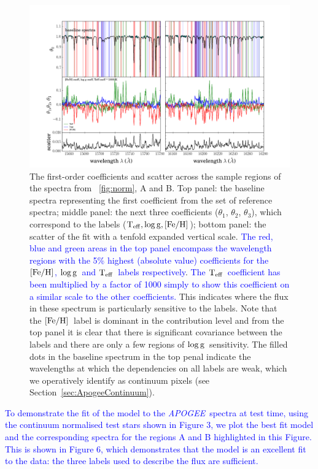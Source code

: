 \documentclass[12pt, preprint]{aastex}
\newcommand{\sectionname}{Section}
\newcommand{\apogee}{\textsl{APOGEE}}
\newcommand{\teff}{\mbox{$\rm T_{eff}$}}
\newcommand{\feh}{\mbox{$\rm [Fe/H]$}}
\newcommand{\logg}{\mbox{$\rm \log g$}}
\begin{document}
\begin{figure}[h!]
\centering
    \includegraphics[width=\hsize]{./plots/aftersubmit/fig5.png}
  \caption{The first-order coefficients and scatter across the sample regions of the spectra from \figurename~\ref{fig:norm}, A and B. Top panel: the baseline spectra representing the first coefficient from the set of reference spectra; middle panel: the next three coefficients ($\theta_1$, $\theta_2$, $\theta_3$),  which correspond to the labels ($\teff, \logg, \feh$); bottom panel: the scatter of the fit with a tenfold expanded vertical scale.  \textcolor{blue}{The red, blue and green areas in the top panel encompass the wavelength regions with the 5\% highest (absolute value) coefficients for the \feh, \logg\ and \teff\ labels respectively}. \textcolor{blue}{The \teff\ coefficient has been multiplied by a factor of 1000 simply to show this coefficient on a similar scale to the other coefficients.} This indicates where the flux in these spectrum is particularly sensitive to the labels.  Note that the \feh\ label is dominant in the contribution level and from the top panel it is clear that there is significant covariance between the labels and there are only a few regions of \logg\ sensitivity. The filled dots in the baseline spectrum in the top penal indicate the wavelengths at which the dependencies on all labels are weak, which we operatively identify as continuum pixels (see \sectionname~\ref{sec:ApogeeContinuum}).}
\label{fig:coeffs}
\end{figure}

\textcolor{blue}{To demonstrate the fit of the model to the \apogee\ spectra at test time, using the continuum normalised test stars shown in Figure 3, we plot the best fit model and the corresponding spectra for the regions A and B highlighted in this Figure. This is shown in Figure 6, which demonstrates that the model is an excellent fit to the data: the three labels used to describe the flux are sufficient. }
\end{document}
